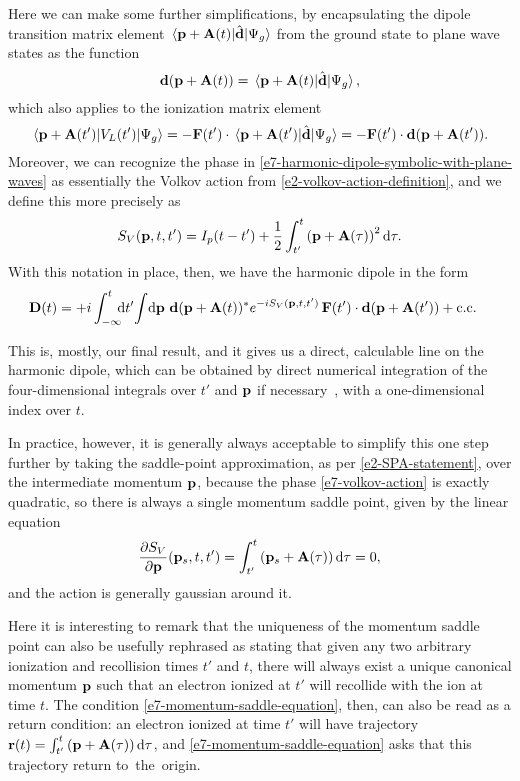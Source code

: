 Here we can make some further simplifications, by encapsulating the dipole transition matrix element $\matrixel{\vbp+\vba(t)}{\hat{\vbd}}{\Psi_g}$ from the ground state to plane wave states as the function
\begin{equation}
\vbd(\vbp+\vba(t))
=
\matrixel{\vbp+\vba(t)}{\hat{\vbd}}{\Psi_g},
\end{equation}
which also applies to the ionization matrix element
\begin{equation}
\matrixel{\vbp+\vba(t')}{V_L(t')}{\Psi_g}
 = 
-\vbf(t')\cdot\matrixel{\vbp+\vba(t')}{\hat{\vbd}}{\Psi_g}
 = 
-\vbf(t')\cdot \vbd(\vbp+\vba(t')).
\end{equation}
Moreover, we can recognize the phase in \eqref{e7-harmonic-dipole-symbolic-with-plane-waves} as essentially the Volkov action from \eqref{e2-volkov-action-definition}, and we define this more precisely as
\begin{equation}
S_V(\vb{p},t,t')
=
I_p(t-t')
+\frac{1}{2} \int_{t'}^{t}\left(\vb{p}+\vb{A}(\tau)\right)^2\mathrm{d}\tau
.
\label{e7-volkov-action}
\end{equation}
With this notation in place, then, we have the harmonic dipole in the form
\begin{align}
\vb{D}(t)
& = 
+i\int_{-\infty}^{t} \!\!\! \mathrm{d} t'\!
\int\!\mathrm{d}\vb{p} \,\,
\vb{d}(\vb{p}+\vb{A}(t))^*
e^{-iS_V(\vb{p},t,t')}  \,
\vb{F}(t')\cdot \vb{d}(\vb{p}+\vb{A}(t'))
+\mathrm{c.c.}
\label{e7-harmonic-dipole-momentum-integral}
\end{align}

This is, mostly, our final result, and it gives us a direct, calculable line on the harmonic dipole, which can be obtained by direct numerical integration of the four-dimensional integrals over $t'$ and $\vb{p}$ if necessary~\cite{LewensteinHHG}, with a one-dimensional index over $t$. 

In practice, however, it is generally always acceptable to simplify this one step further by taking the saddle-point approximation, as per \eqref{e2-SPA-statement}, over the intermediate momentum $\vb{p}$, because the phase \eqref{e7-volkov-action} is exactly quadratic, so there is always a single momentum saddle point, given by the linear equation
\begin{equation}
\frac{\partial S_V}{\partial \vb{p}}(\vb{p}_s,t,t')
=
\int_{t'}^{t} \left(\vb{p}_s+\vb{A}(\tau)\right)\mathrm{d}\tau
=0
,
\label{e7-momentum-saddle-equation}
\end{equation}
and the action is generally gaussian around it. 

Here it is interesting to remark that the uniqueness of the momentum saddle point can also be usefully rephrased as stating that given any two arbitrary ionization and recollision times $t'$ and $t$, there will always exist a unique canonical momentum $\vb{p}$ such that an electron ionized at $t'$ will recollide with the ion at time $t$. The condition \eqref{e7-momentum-saddle-equation}, then, can also be read as a return condition: an electron ionized at time $t'$ will have trajectory $\vb{r}(t)=\int_{t'}^{t} \left(\vb{p}+\vb{A}(\tau)\right)\mathrm{d}\tau$, and \eqref{e7-momentum-saddle-equation} asks that this trajectory return to~the~origin.

